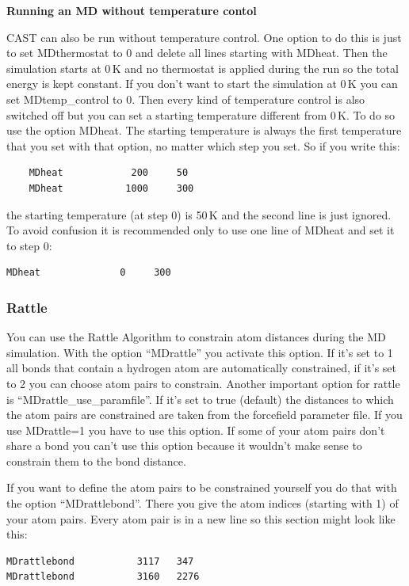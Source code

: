 \documentclass[10pt,a4paper]{article} %
\begin{document}
\textbf{	Running an MD without temperature contol}
	
	\ac{CAST} can also be run without temperature control. One option to do this is just to set MDthermostat to 0 and delete all lines starting with MDheat. Then the simulation starts at 0\,K and no thermostat is applied during the run so the total energy is kept constant. If you don't want to start the simulation at 0\,K you can set MDtemp\_control to 0. Then every kind of temperature control is also switched off but you can set a starting temperature different from 0\,K. To do so use the option MDheat. The starting temperature is always the first temperature that you set with that option, no matter which step you set. So if you write this:
			\begin{lstlisting}
	MDheat			  200  	  50
	MDheat 			 1000     300
	\end{lstlisting}
	the starting temperature (at step 0) is 50\,K and the second line is just ignored. To avoid confusion it is recommended only to use one line of MDheat and set it to step 0:
\begin{lstlisting}
MDheat			    0  	  300
\end{lstlisting}	

\subsubsection{Rattle}

You can use the Rattle Algorithm\supercite{rattle} to constrain atom distances during the MD simulation. With the option ``MDrattle'' you activate this option. If it's set to 1 all bonds that contain a hydrogen atom are automatically constrained, if it's set to 2 you can choose atom pairs to constrain. Another important option for rattle is ``MDrattle\_use\_paramfile''. If it's set to true (default) the distances to which the atom pairs are constrained are taken from the forcefield parameter file. If you use MDrattle=1 you have to use this option. If some of your atom pairs don't share a bond you can't use this option because it wouldn't make sense to constrain them to the bond distance. 

If you want to define the atom pairs to be constrained yourself you do that with the option ``MDrattlebond''. There you give the atom indices (starting with 1) of your atom pairs. Every atom pair is in a new line so this section might look like this:
\begin{lstlisting}
MDrattlebond           3117   347
MDrattlebond           3160   2276
\end{lstlisting}
\end{document}
